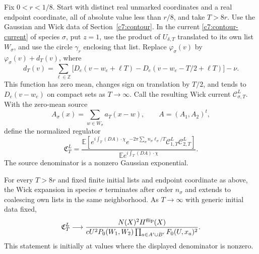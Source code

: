 Fix $0<r<1/8$. Start with distinct real unmarked coordinates
and a real endpoint coordinate, all of absolute value less than $r/8$,
and take $T>8r$. Use the Gaussian and Wick data of
Section~\ref{c7:contour}. In the current
\eqref{c7:contour-current} of species $\sigma$, put $z=1$, use the
product of $U_{\delta,T}$ translated to its own list $W_\sigma$,
and use the circle $\gamma_r$ enclosing that list. Replace
$\varphi_\sigma(v)$ by $\varphi_\sigma(v)+d_T(v)$, where
\begin{equation}\label{j:marked-kink}
 d_T(v)=\sum_{\ell\in\mathbb Z}
 \bigl[D_e(v-w_e+\ell T)-D_e(v-w_e-T/2+\ell T)\bigr]-\nu.
\end{equation}
This function has zero mean, changes sign on translation by $T/2$,
and tends to $D_e(v-w_e)$ on compact sets as $T\to\infty$.
Call the resulting Wick current $\mathcal C^L_{\sigma,T}$.
With the zero-mean source
\[
 A_\sigma(x)=\sum_{w\in W_\sigma}a_T(x-w),\qquad
 A=(A_1,A_2)^t,
\]
define the normalized regulator
\begin{equation}\label{j:marked-regulator}
 \mathfrak C_T^L=
 \frac{\mathbb E\!\left[
 e^{i\int_T(DA)\cdot\chi}
 e^{-2\pi\sum_\sigma n_\sigma\ell_\sigma/T}
 \mathcal C^L_{1,T}\mathcal C^L_{2,T}\right]}
 {\mathbb E e^{i\int_T(DA)\cdot\chi}}.
\end{equation}
The source denominator is a nonzero Gaussian exponential.

\begin{proposition}\label{j:marked-regulated-limit}
For every $T>8r$ and fixed finite initial lists and endpoint
coordinate as above,
the Wick expansion in species $\sigma$ terminates after order
$n_\sigma$ and extends to coalescing own lists in the same
neighborhood. As $T\to\infty$ with generic initial data fixed,
\begin{equation}\label{j:marked-regulator-limit}
 \mathfrak C_T^L\longrightarrow
 \frac{N(X)^2H^{\rm flip}(X)}
 {cU^2P_0(W_1,W_2)\prod_{a\in A'\cup B'}F_0(U,x_a)^2}.
\end{equation}
This statement is initially at values where the displayed
denominator is nonzero.
\end{proposition}

